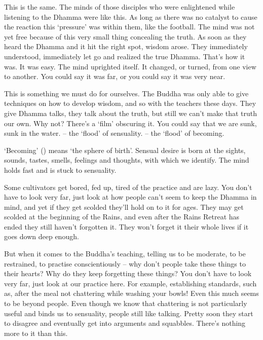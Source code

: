 This is the same. The minds of those disciples who were enlightened while listening to the Dhamma were like this. As long as there was no catalyst to cause the reaction this `pressure' was within them, like the football. The mind was not yet free because of this very small thing concealing the truth. As soon as they heard the Dhamma and it hit the right spot, wisdom arose. They immediately understood, immediately let go and realized the true Dhamma. That's how it was. It was easy. The mind uprighted itself. It changed, or turned, from one view to another. You could say it was far, or you could say it was very near. 

This is something we must do for ourselves. The Buddha was only able to give techniques on how to develop wisdom, and so with the teachers these days. They give Dhamma talks, they talk about the truth, but still we can't make that truth our own. Why not? There's a `film' obscuring it. You could say that we are sunk, sunk in the water.  -- the `flood' of sensuality.  -- the `flood' of becoming. 

`Becoming' () means `the sphere of birth'. Sensual desire is born at the sights, sounds, tastes, smells, feelings and thoughts, with which we identify. The mind holds fast and is stuck to sensuality. 

Some cultivators get bored, fed up, tired of the practice and are lazy. You don't have to look very far, just look at how people can't seem to keep the Dhamma in mind, and yet if they get scolded they'll hold on to it for ages. They may get scolded at the beginning of the Rains, and even after the Rains Retreat has ended they still haven't forgotten it. They won't forget it their whole lives if it goes down deep enough.

But when it comes to the Buddha's teaching, telling us to be moderate, to be restrained, to practise conscientiously -- why don't people take these things to their hearts? Why do they keep forgetting these things? You don't have to look very far, just look at our practice here. For example, establishing standards, such as, after the meal not chattering while washing your bowls! Even this much seems to be beyond people. Even though we know that chattering is not particularly useful and binds us to sensuality, people still like talking. Pretty soon they start to disagree and eventually get into arguments and squabbles. There's nothing more to it than this. 

